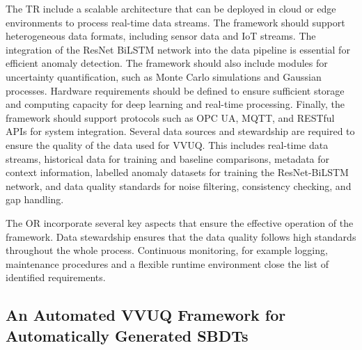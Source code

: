 The TR include a scalable architecture that can be deployed in cloud or edge environments to process real-time data streams. The framework should support heterogeneous data formats, including sensor data and IoT streams. The integration of the ResNet BiLSTM network into the data pipeline is essential for efficient anomaly detection. The framework should also include modules for uncertainty quantification, such as Monte Carlo simulations and Gaussian processes. Hardware requirements should be defined to ensure sufficient storage and computing capacity for deep learning and real-time processing. Finally, the framework should support protocols such as OPC UA, MQTT, and RESTful APIs for system integration. Several data sources and stewardship are required to ensure the quality of the data used for VVUQ. This includes real-time data streams, historical data for training and baseline comparisons, metadata for context information, labelled anomaly datasets for training the ResNet-BiLSTM network, and data quality standards for noise filtering, consistency checking, and gap handling.

The OR incorporate several key aspects that ensure the effective operation of the framework. Data stewardship ensures that the data quality follows high standards throughout the whole process. Continuous monitoring, for example logging, maintenance procedures and a flexible runtime environment close the list of identified requirements.

\subsection{An Automated VVUQ Framework for Automatically Generated SBDTs}
\label{sec:framework}

